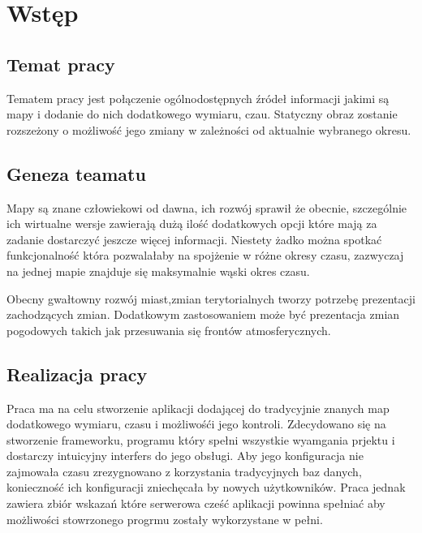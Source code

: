 \chapter{Wstęp}
\label{cha:wstep}

\nocite{gisSystems}
\nocite{webgis}
\nocite{imprxml}
\nocite{perfxml}



\section{Temat pracy}
\label{sec:tematPracy}


Tematem pracy jest połączenie ogólnodostępnych źródeł informacji jakimi są mapy i dodanie do nich dodatkowego wymiaru, czau. Statyczny obraz zostanie rozszeżony o możliwość jego zmiany w zależności od aktualnie wybranego okresu. 

\section{Geneza teamatu}
\label{sec:geneza}

Mapy są znane człowiekowi od dawna, ich rozwój sprawił że obecnie, szczególnie ich wirtualne wersje zawierają dużą ilość dodatkowych opcji które mają za zadanie dostarczyć jeszcze więcej informacji. Niestety żadko można spotkać funkcjonalność która pozwalałaby na spojżenie w różne okresy czasu, zazwyczaj na jednej mapie znajduje się maksymalnie wąski okres czasu.

Obecny gwałtowny rozwój miast,zmian terytorialnych tworzy potrzebę prezentacji zachodzących zmian. Dodatkowym zastosowaniem może być prezentacja zmian pogodowych takich jak przesuwania się frontów atmosferycznych.

\section{Realizacja pracy}
\label{sec:realizacja}

Praca ma na celu stworzenie aplikacji dodającej do tradycyjnie znanych map dodatkowego wymiaru, czasu i możliwośći jego kontroli. Zdecydowano się na stworzenie frameworku, programu który spełni wszystkie wyamgania prjektu i dostarczy intuicyjny interfers do jego obsługi. Aby jego konfiguracja nie zajmowała czasu zrezygnowano z korzystania tradycyjnych baz danych, konieczność ich konfiguracji zniechęcała by nowych użytkowników. Praca jednak zawiera zbiór wskazań które serwerowa cześć aplikacji powinna spełniać aby możliwości stowrzonego progrmu zostały wykorzystane w pełni.

